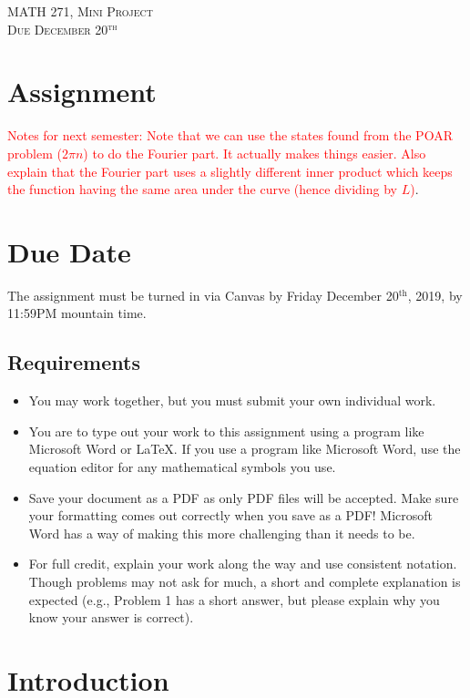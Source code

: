 \documentclass{article}
\begin{document}
\begin{center}
   \LARGE{\textsc{MATH 271, Mini Project}}\\
   \large{\textsc{Due December 20$^\textrm{th}$}}
\end{center}
\vspace{.5cm}

\section*{Assignment}
\textcolor{red}{Notes for next semester: Note that we can use the states found from the POAR problem ($2\pi n$) to do the Fourier part. It actually makes things easier.  Also explain that the Fourier part uses a slightly different inner product which keeps the function having the same area under the curve (hence dividing by $L$)}.
\section*{Due Date}
The assignment must be turned in via Canvas by Friday December 20$^\textrm{th}$, 2019, by 11:59PM mountain time.
\subsection*{Requirements}
\begin{itemize}
    \item You may work together, but you must submit your own individual work.
    \item You are to type out your work to this assignment using a program like Microsoft Word or \LaTeX. If you use a program like Microsoft Word, use the equation editor for any mathematical symbols you use. 
    \item Save your document as a PDF as only PDF files will be accepted. Make sure your formatting comes out correctly when you save as a PDF! Microsoft Word has a way of making this more challenging than it needs to be.
    \item For full credit, explain your work along the way and use consistent notation.  Though problems may not ask for much, a short and complete explanation is expected (e.g., Problem 1 has a short answer, but please explain why you know your answer is correct).
\end{itemize}


\section{Introduction}
\end{document}
